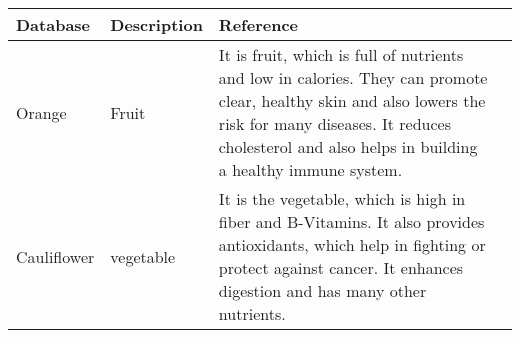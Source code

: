\begin{newpdflayout}{210mm}{297mm}

\begin{center}  
\begin{tabular}{ | l | l | l | p{5cm} |} %
\hline  
Database    & Description      & Reference \\ \hline  
Orange      & Fruit     & It is fruit, which is full of nutrients and low in calories. They can promote clear, healthy skin and also lowers the risk for many diseases. It reduces cholesterol and also helps in building a healthy immune system.\\ \hline  
Cauliflower & vegetable & It is the vegetable, which is high in fiber and B-Vitamins. It also provides antioxidants, which help in fighting or protect against cancer. It enhances digestion and has many other nutrients.\\ \hline  
\end{tabular}  
\end{center}

\end{newpdflayout}


